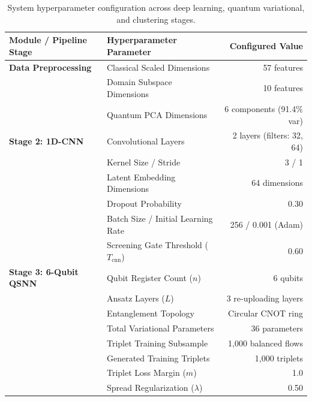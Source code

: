 \documentclass[preprint,12pt]{elsarticle}
\begin{document}
\begin{table}[t]
\centering
\caption{System hyperparameter configuration across deep learning, quantum variational, and clustering stages.}
\label{tab:hyperparameters}
\small
\begin{tabular}{llr}
\toprule
\textbf{Module / Pipeline Stage} & \textbf{Hyperparameter Parameter} & \textbf{Configured Value} \\
\midrule
\textbf{Data Preprocessing}    & Classical Scaled Dimensions       & 57 features \\
                               & Domain Subspace Dimensions        & 10 features \\
                               & Quantum PCA Dimensions            & 6 components (91.4\% var) \\
\midrule
\textbf{Stage 2: 1D-CNN}       & Convolutional Layers              & 2 layers (filters: 32, 64) \\
                               & Kernel Size / Stride              & 3 / 1 \\
                               & Latent Embedding Dimensions       & 64 dimensions \\
                               & Dropout Probability               & 0.30 \\
                               & Batch Size / Initial Learning Rate & 256 / 0.001 (Adam) \\
                               & Screening Gate Threshold ($T_{\text{cnn}}$) & 0.60 \\
\midrule
\textbf{Stage 3: 6-Qubit QSNN} & Qubit Register Count ($n$)        & 6 qubits \\
                               & Ansatz Layers ($L$)               & 3 re-uploading layers \\
                               & Entanglement Topology             & Circular CNOT ring \\
                               & Total Variational Parameters      & 36 parameters \\
                               & Triplet Training Subsample        & 1,000 balanced flows \\
                               & Generated Training Triplets       & 1,000 triplets \\
                               & Triplet Loss Margin ($m$)         & 1.0 \\
                               & Spread Regularization ($\lambda$) & 0.50 \\

\end{tabular}
\end{table}
\end{document}
